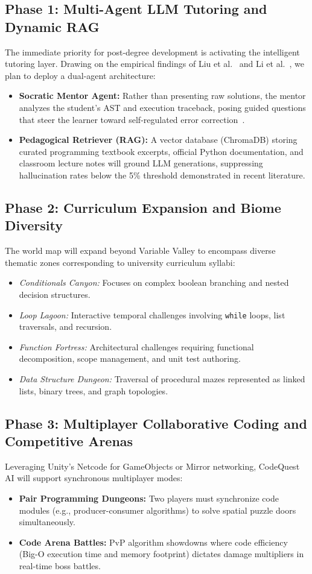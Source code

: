 \subsection{Phase 1: Multi-Agent LLM Tutoring and Dynamic RAG}
The immediate priority for post-degree development is activating the intelligent tutoring layer. Drawing on the empirical findings of Liu et al.~\cite{liu2025lpitutor} and Li et al.~\cite{li2025tutorllm}, we plan to deploy a dual-agent architecture:
\begin{itemize}
    \item \textbf{Socratic Mentor Agent:} Rather than presenting raw solutions, the mentor analyzes the student's AST and execution traceback, posing guided questions that steer the learner toward self-regulated error correction~\cite{ge2025srlagent}.
    \item \textbf{Pedagogical Retriever (RAG):} A vector database (ChromaDB) storing curated programming textbook excerpts, official Python documentation, and classroom lecture notes will ground LLM generations, suppressing hallucination rates below the 5\% threshold demonstrated in recent literature.
\end{itemize}

\subsection{Phase 2: Curriculum Expansion and Biome Diversity}
The world map will expand beyond Variable Valley to encompass diverse thematic zones corresponding to university curriculum syllabi:
\begin{itemize}
    \item \emph{Conditionals Canyon:} Focuses on complex boolean branching and nested decision structures.
    \item \emph{Loop Lagoon:} Interactive temporal challenges involving \texttt{while} loops, list traversals, and recursion.
    \item \emph{Function Fortress:} Architectural challenges requiring functional decomposition, scope management, and unit test authoring.
    \item \emph{Data Structure Dungeon:} Traversal of procedural mazes represented as linked lists, binary trees, and graph topologies.
\end{itemize}

\subsection{Phase 3: Multiplayer Collaborative Coding and Competitive Arenas}
Leveraging Unity's Netcode for GameObjects or Mirror networking, CodeQuest AI will support synchronous multiplayer modes:
\begin{itemize}
    \item \textbf{Pair Programming Dungeons:} Two players must synchronize code modules (e.g., producer-consumer algorithms) to solve spatial puzzle doors simultaneously.
    \item \textbf{Code Arena Battles:} PvP algorithm showdowns where code efficiency (Big-O execution time and memory footprint) dictates damage multipliers in real-time boss battles.
\end{itemize}

